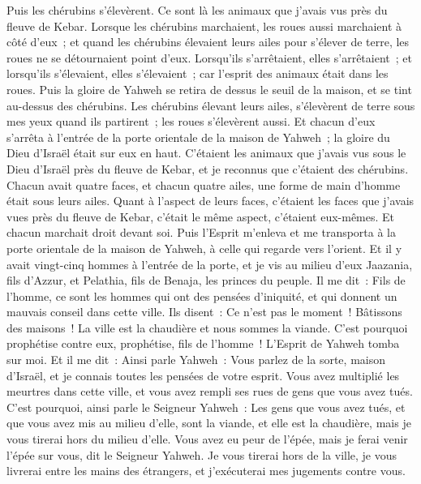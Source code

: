 \begin{multicols}{2}
Puis les chérubins s'élevèrent. Ce sont là les animaux que j'avais vus près du fleuve de Kebar.
Lorsque les chérubins marchaient, les roues aussi marchaient à côté d'eux~; et quand les chérubins élevaient leurs ailes pour s'élever de terre, les roues ne se détournaient point d'eux.
Lorsqu'ils s'arrêtaient, elles s'arrêtaient~; et lorsqu'ils s'élevaient, elles s'élevaient~; car l'esprit des animaux était dans les roues.
Puis la gloire de Yahweh se retira de dessus le seuil de la maison, et se tint au-dessus des chérubins.
Les chérubins élevant leurs ailes, s'élevèrent de terre sous mes yeux quand ils partirent~; les roues s'élevèrent aussi. Et chacun d'eux s'arrêta à l'entrée de la porte orientale de la maison de Yahweh~; la gloire du Dieu d'Israël était sur eux en haut.
C'étaient les animaux que j'avais vus sous le Dieu d'Israël près du fleuve de Kebar, et je reconnus que c'étaient des chérubins.
Chacun avait quatre faces, et chacun quatre ailes, une forme de main d'homme était sous leurs ailes.
Quant à l'aspect de leurs faces, c'étaient les faces que j'avais vues près du fleuve de Kebar, c'était le même aspect, c'étaient eux-mêmes. Et chacun marchait droit devant soi.
\VerseOne{}Puis l'Esprit m'enleva et me transporta à la porte orientale de la maison de Yahweh, à celle qui regarde vers l'orient. Et il y avait vingt-cinq hommes à l'entrée de la porte, et je vis au milieu d'eux Jaazania, fils d'Azzur, et Pelathia, fils de Benaja, les princes du peuple.
Il me dit~: Fils de l'homme, ce sont les hommes qui ont des pensées d'iniquité, et qui donnent un mauvais conseil dans cette ville.
Ils disent~: Ce n'est pas le moment~! Bâtissons des maisons~! La ville est la chaudière et nous sommes la viande.
C'est pourquoi prophétise contre eux, prophétise, fils de l'homme~!
L'Esprit de Yahweh tomba sur moi. Et il me dit~: Ainsi parle Yahweh~: Vous parlez de la sorte, maison d'Israël, et je connais toutes les pensées de votre esprit.
Vous avez multiplié les meurtres dans cette ville, et vous avez rempli ses rues de gens que vous avez tués.
C'est pourquoi, ainsi parle le Seigneur Yahweh~: Les gens que vous avez tués, et que vous avez mis au milieu d'elle, sont la viande, et elle est la chaudière, mais je vous tirerai hors du milieu d'elle.
Vous avez eu peur de l'épée, mais je ferai venir l'épée sur vous, dit le Seigneur Yahweh.
Je vous tirerai hors de la ville, je vous livrerai entre les mains des étrangers, et j'exécuterai mes jugements contre vous.

\end{multicols}
